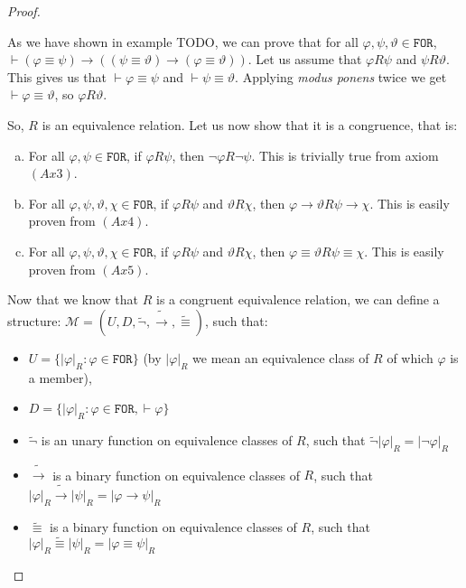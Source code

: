 \documentclass{article}
\theoremstyle{definition}
\theoremstyle{definition}
\newcommand*{\id}{\equiv}
\newcommand*{\ra}{\rightarrow}
\newcommand*{\FOR}{\texttt{FOR}}
\begin{document}
\begin{proof}
\begin{enumerate}[(a)]
              As we have shown in example TODO, we can prove that for all $\varphi, \psi,
                  \vartheta \in \FOR$, $\vdash (\varphi \id \psi) \ra ((\psi \id \vartheta) \ra
                  (\varphi \id \vartheta))$. Let us assume that $\varphi R \psi$ and $\psi R
                  \vartheta$. This gives us that $\vdash \varphi \id \psi$ and $\vdash \psi \id
                  \vartheta$. Applying \emph{modus ponens} twice we get $\vdash \varphi \id
                  \vartheta$, so $\varphi R \vartheta$.
    \end{enumerate}

    So, $R$ is an equivalence relation. Let us now show that it is a congruence,
    that is:
    \begin{enumerate}[(a)]
        \item For all $\varphi, \psi \in \FOR$, if $\varphi R \psi$, then $\lnot \varphi R
                  \lnot \psi$. This is trivially true from axiom $(Ax3)$.
        \item For all $\varphi, \psi, \vartheta, \chi \in \FOR$, if $\varphi R \psi$ and
              $\vartheta R \chi$, then $\varphi \ra \vartheta R \psi \ra \chi$. This is
              easily proven from $(Ax4)$.
        \item For all $\varphi, \psi, \vartheta, \chi \in \FOR$, if $\varphi R \psi$ and
              $\vartheta R \chi$, then $\varphi \id \vartheta R \psi \id \chi$. This is
              easily proven from $(Ax5)$.
    \end{enumerate}

    Now that we know that $R$ is a congruent equivalence relation, we can define a
    structure: $\mathcal{M} = (U, D, \tilde{\lnot}, \tilde{\ra}, \tilde{\id})$,
    such that:
    \begin{itemize}
        \item $U = \{ |\varphi|_R : \varphi \in \FOR \}$ (by $|\varphi|_R$ we mean an equivalence class of $R$ of which $\varphi$ is a member),
        \item $D = \{ |\varphi|_R : \varphi \in \FOR, \vdash \varphi\}$
        \item $\tilde{\lnot}$ is an unary function on equivalence classes of $R$, such that $\tilde{\lnot}|\varphi|_R = |\lnot \varphi|_R$
        \item $\tilde{\ra}$ is a binary function on equivalence classes of $R$, such that $|\varphi|_R \tilde{\ra} |\psi|_R = |\varphi \ra \psi|_R$
        \item $\tilde{\id}$ is a binary function on equivalence classes of $R$, such that $|\varphi|_R \tilde{\id} |\psi|_R = |\varphi \id \psi|_R$
    \end{itemize}


\end{proof}
\end{document}
